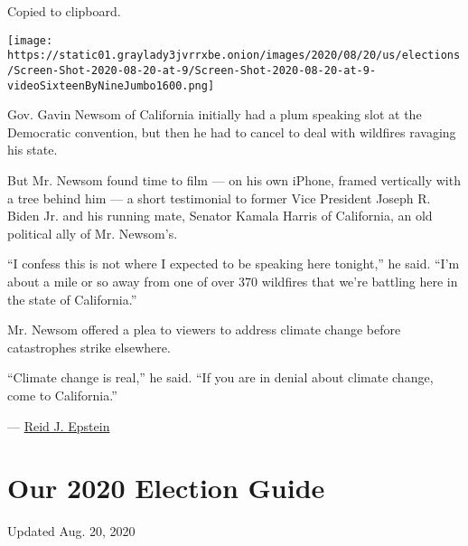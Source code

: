 Copied to clipboard.

\texttt{[image: https://static01.graylady3jvrrxbe.onion/images/2020/08/20/us/elections/Screen-Shot-2020-08-20-at-9/Screen-Shot-2020-08-20-at-9-videoSixteenByNineJumbo1600.png]}

Gov. Gavin Newsom of California initially had a plum speaking slot at
the Democratic convention, but then he had to cancel to deal with
wildfires ravaging his state.

But Mr. Newsom found time to film --- on his own iPhone, framed
vertically with a tree behind him --- a short testimonial to former Vice
President Joseph R. Biden Jr. and his running mate, Senator Kamala
Harris of California, an old political ally of Mr. Newsom's.

``I confess this is not where I expected to be speaking here tonight,''
he said. ``I'm about a mile or so away from one of over 370 wildfires
that we're battling here in the state of California.''

Mr. Newsom offered a plea to viewers to address climate change before
catastrophes strike elsewhere.

``Climate change is real,'' he said. ``If you are in denial about
climate change, come to California.''

--- \href{https://www.nytimes3xbfgragh.onion/by/reid-j-epstein}{Reid J.
Epstein}

\hypertarget{our-2020-election-guide}{%
\section{Our 2020 Election Guide}\label{our-2020-election-guide}}

Updated Aug. 20, 2020

